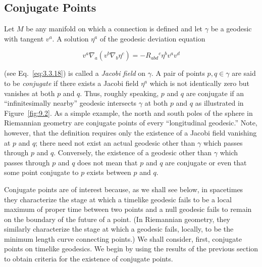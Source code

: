 
\subsection{Conjugate Points}\label{sec:9.3}

\setcounter{theorem}{0}

Let \(M\) be any manifold on which a connection is defined and let \(\gamma\) be a
geodesic with tangent \(v^a\). A solution \(\eta^a\) of the geodesic deviation equation

\begin{equation}
  v^a\nabla_a(v^b\nabla_b\eta^c)
  =-R_{abd}{}^c\eta^bv^av^d
  \tag{9.3.1}\label{eq:9.3.1}
\end{equation}

(see Eq.~\eqref{eq:3.3.18}) is called a \emph{Jacobi field} on \(\gamma\). A pair of points
\(p,q\in\gamma\) are said to be \emph{conjugate} if there exists a Jacobi field \(\eta^a\)
which is not identically zero but vanishes at both \(p\) and \(q\). Thus, roughly
speaking, \(p\) and \(q\) are conjugate if an ``infinitesimally nearby'' geodesic intersects
\(\gamma\) at both \(p\) and \(q\) as illustrated in Figure~\ref{fig:9.2}. As a simple
example, the north and south poles of the sphere in Riemannian geometry are
conjugate points of every ``longitudinal geodesic.'' Note, however, that the definition
requires only the existence of a Jacobi field vanishing at \(p\) and \(q\); there need not
exist an actual geodesic other than \(\gamma\) which passes through \(p\) and \(q\).
Conversely, the existence of a geodesic other than \(\gamma\) which passes through \(p\)
and \(q\) does not mean that \(p\) and \(q\) are conjugate or even that some point
conjugate to \(p\) exists between \(p\) and \(q\).



Conjugate points are of interest because, as we shall see below, in spacetimes they
characterize the stage at which a timelike geodesic fails to be a local maximum of
proper time between two points and a null geodesic fails to remain on the boundary
of the future of a point. (In Riemannian geometry, they similarly characterize the
stage at which a geodesic fails, locally, to be the minimum length curve connecting
points.) We shall consider, first, conjugate points on timelike geodesics. We begin
by using the results of the previous section to obtain criteria for the existence of
conjugate points.

